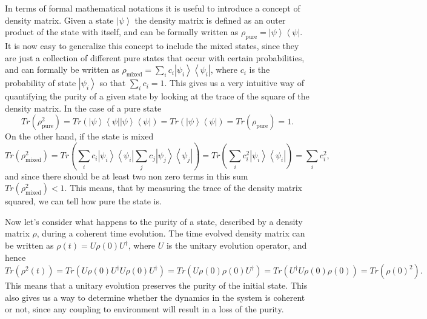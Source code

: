 In terms of formal mathematical notations it is useful to introduce a concept of density matrix. Given a state $\left|\psi \right>$ the density matrix is defined as an outer product of the state with itself, and can be formally written as $\rho_{\mathrm{pure}} = \left|\psi \right> \left< \psi \right|$. It is now easy to generalize this concept to include the mixed states, since they are just a collection of different pure states that occur  with certain probabilities, and can formally be written as $\rho_{\mathrm{mixed}} = \sum_{i} c_{i}\left|\psi_{i} \right> \left< \psi_{i} \right|$, where $c_{i}$ is the probability of state $\left|\psi_{i} \right>$ so that $\sum_{i}c_{i}=1$. This gives us a very intuitive way of quantifying the purity of a given state by looking at the trace of the square of the density matrix. In the case of a pure state 
\begin{equation}
Tr(\rho_{\mathrm{pure}}^2) = Tr(\left|\psi \right> \left< \psi \right| \left|\psi \right> \left< \psi \right|) = Tr(\left|\psi \right> \left< \psi \right|) = Tr(\rho_{\mathrm{pure}})=1.
\end{equation}
On the other hand, if the state is mixed
\begin{equation}
Tr(\rho_{\mathrm{mixed}}^2) = Tr(\sum_{i} c_{i}\left|\psi_{i} \right> \left< \psi_{i} \right| \sum_{j} c_{j}\left|\psi_{j} \right> \left< \psi_{j} \right|) = Tr(\sum_{i} c^2_{i}\left|\psi_{i} \right> \left< \psi_{i} \right|) = \sum_{i} c^2_{i},
\end{equation}
and since there should be at least two non zero terms in this sum $Tr(\rho_{\mathrm{mixed}}^2) <1$. This means, that by measuring the trace of the density matrix squared, we can tell how pure the state is. 

Now let's consider what happens to the purity of a state, described by a density matrix $\rho$, during a coherent time evolution. The time evolved density matrix can be written as $\rho(t) = U\rho(0) U^{\dagger}$, where $U$ is the unitary evolution operator, and hence 
\begin{equation}
Tr(\rho^2(t)) = Tr(U\rho(0) U^{\dagger} U\rho(0) U^{\dagger}) = Tr(U\rho(0) \rho(0) U^{\dagger}) = Tr(U^{\dagger} U\rho(0) \rho(0))  = Tr(\rho(0)^2). 
\end{equation}
This means that a unitary evolution preserves the purity of the initial state. This also gives us a way to determine whether the dynamics in the system is coherent or not, since any coupling to environment will result in a loss of the purity. 


